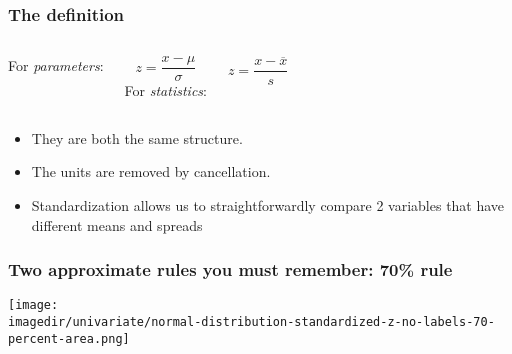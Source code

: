 %
%
%
%
%
%
%

\begin{frame}\frametitle{The {\color{purple}{standard form}} definition}
	\begin{columns}[T]
		For \emph{\color{myGreen}parameters}: 
			
			\[z = \dfrac{x - \mu}{\sigma}\]
		For \emph{\color{myGreen}statistics}: 
			
			\[z = \displaystyle \frac{x - \overline{x}}{s}\]
	\end{columns}
	
	\vspace{36pt}
	\begin{itemize}
		\item	They are both the same structure.
		\item	The units are removed by cancellation.
		\item	Standardization allows us to straightforwardly compare 2 variables that have different means and spreads
	\end{itemize}
\end{frame}

\begin{frame}\frametitle{Two approximate rules you must remember: 70\% rule}
	\begin{center}
		\texttt{[image: \\imagedir/univariate/normal-distribution-standardized-z-no-labels-70-percent-area.png]}
	\end{center}
\end{frame}

